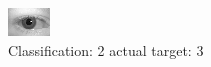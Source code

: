 \begin{figure}[h!]
\begin{center}
\includegraphics[width=0.60\columnwidth]{figures/ID588_class_2_target_3.png}
\end{center}
\caption{ Classification: 2 actual target: 3}
\label{fig:ID588_class_2_target_3}
\end{figure}
